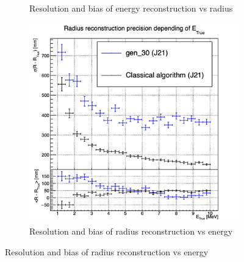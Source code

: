 \documentclass[../main.tex]{subfiles}
\begin{document}
{{\begin{figure}[ht]
\begin{subfigure}[t]{0.32\linewidth}
    \caption{Resolution and bias of energy reconstruction vs radius}
    \label{fig:jcnn:vic_cnn:multi_vic_cnn_MESBvRTC}
  \end{subfigure}
  \begin{subfigure}[t]{0.32\linewidth}
    \centering
    \includegraphics[width=\linewidth]{images/jcnn/vic_cnn/multi_vic_cnn_MSBvETC.png}
    \caption{Resolution and bias of radius reconstruction vs energy}
    \label{fig:jcnn:vic_cnn:multi_vic_cnn_MSBvETC}
  \end{subfigure}



\end{figure}}}
\end{document}
